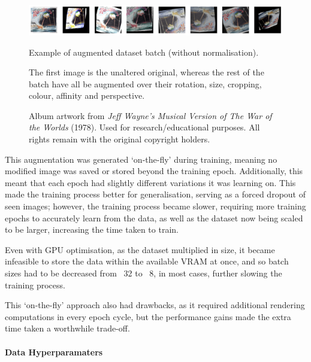                         \begin{figure}[h]
                            \centering
                            \includegraphics[width=\textwidth]{images/AugmentedArts.png}
                            \caption{Example of augmented dataset batch (without normalisation).}
                            \label{fig:augmentedArts}
                            \caption*{
                                The first image is the unaltered original, whereas the rest of the batch have all be augmented over their rotation, size, cropping, colour, affinity and perspective.
                            }
                            \caption*{
                                Album artwork from \textit{Jeff Wayne's Musical Version of The War of the Worlds} (1978).  
                                \footnotesize Used for research/educational purposes. All rights remain with the original copyright holders.
                            }
                        \end{figure}
    
                        This augmentation was generated `on-the-fly' during training, meaning no modified image was saved or stored beyond the training epoch. Additionally, this meant that each epoch had slightly different variations it was learning on. This made the training process better for generalisation, serving as a forced dropout of seen images; however, the training process became slower, requiring more training epochs to accurately learn from the data, as well as the dataset now being scaled to be larger, increasing the time taken to train.
    
                        Even with GPU optimisation, as the dataset multiplied in size, it became infeasible to store the data within the available VRAM at once, and so batch sizes had to be decreased from ~32 to ~8, in most cases, further slowing the training process.
    
                        This `on-the-fly' approach also had drawbacks, as it required additional rendering computations in every epoch cycle, but the performance gains made the extra time taken a worthwhile trade-off.
        
                    \paragraph{Data Hyperparamaters}
    
